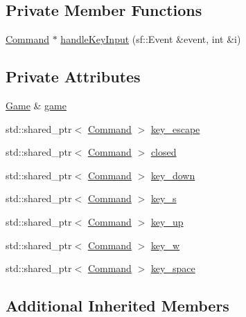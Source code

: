 \subsection*{Private Member Functions}
\begin{DoxyCompactItemize}
\item 
\hyperlink{class_command}{Command} $\ast$ \hyperlink{class_menu_input_handler_aefd1edfd9f0d0770383c4977416de3bf}{handle\+Key\+Input} (sf\+::\+Event \&event, int \&i)
\end{DoxyCompactItemize}
\subsection*{Private Attributes}
\begin{DoxyCompactItemize}
\item 
\hyperlink{class_game}{Game} \& \hyperlink{class_menu_input_handler_a49048af3c063e2b81ef6b296e9ad762c}{game}
\item 
std\+::shared\+\_\+ptr$<$ \hyperlink{class_command}{Command} $>$ \hyperlink{class_menu_input_handler_abf019bb1ca2f82975870e932e3cbd558}{key\+\_\+escape}
\item 
std\+::shared\+\_\+ptr$<$ \hyperlink{class_command}{Command} $>$ \hyperlink{class_menu_input_handler_a493334cca9bde4229be296ad44e3db9b}{closed}
\item 
std\+::shared\+\_\+ptr$<$ \hyperlink{class_command}{Command} $>$ \hyperlink{class_menu_input_handler_a29143574ca3b79dccb3a98260184968c}{key\+\_\+down}
\item 
std\+::shared\+\_\+ptr$<$ \hyperlink{class_command}{Command} $>$ \hyperlink{class_menu_input_handler_aa16ab7856da1bc4c6dea371e244939fb}{key\+\_\+s}
\item 
std\+::shared\+\_\+ptr$<$ \hyperlink{class_command}{Command} $>$ \hyperlink{class_menu_input_handler_ae1b3b9df835e3182dba3bbf1fd8b98aa}{key\+\_\+up}
\item 
std\+::shared\+\_\+ptr$<$ \hyperlink{class_command}{Command} $>$ \hyperlink{class_menu_input_handler_a052c981814cc918c88d17d7b4f0deb0e}{key\+\_\+w}
\item 
std\+::shared\+\_\+ptr$<$ \hyperlink{class_command}{Command} $>$ \hyperlink{class_menu_input_handler_a8f596f6b958c7007a3ccc44ac3d8666e}{key\+\_\+space}
\end{DoxyCompactItemize}
\subsection*{Additional Inherited Members}


